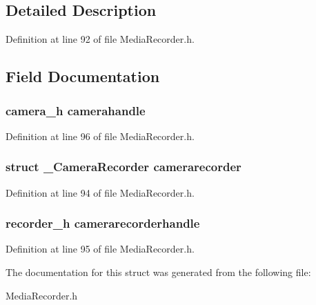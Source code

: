 \subsection{Detailed Description}


Definition at line 92 of file Media\-Recorder.\-h.



\subsection{Field Documentation}
\hypertarget{struct__CameraRecorderExtends_a9330305d1f580a90135b6a03bea47bc7}{
\subsubsection[{camerahandle}]{\setlength{\rightskip}{0pt plus 5cm}camera\-\_\-h camerahandle}}\label{struct__CameraRecorderExtends_a9330305d1f580a90135b6a03bea47bc7}


Definition at line 96 of file Media\-Recorder.\-h.

\hypertarget{struct__CameraRecorderExtends_af4cf6d238f7e59a61fd0ba13c39a10ad}{
\subsubsection[{camerarecorder}]{\setlength{\rightskip}{0pt plus 5cm}struct {\bf \-\_\-\-Camera\-Recorder} camerarecorder}}\label{struct__CameraRecorderExtends_af4cf6d238f7e59a61fd0ba13c39a10ad}


Definition at line 94 of file Media\-Recorder.\-h.

\hypertarget{struct__CameraRecorderExtends_ad514124f62d6cded798098cfcd62ceb8}{
\subsubsection[{camerarecorderhandle}]{\setlength{\rightskip}{0pt plus 5cm}recorder\-\_\-h camerarecorderhandle}}\label{struct__CameraRecorderExtends_ad514124f62d6cded798098cfcd62ceb8}


Definition at line 95 of file Media\-Recorder.\-h.



The documentation for this struct was generated from the following file\-:\begin{DoxyCompactItemize}
\item 
Media\-Recorder.\-h\end{DoxyCompactItemize}
